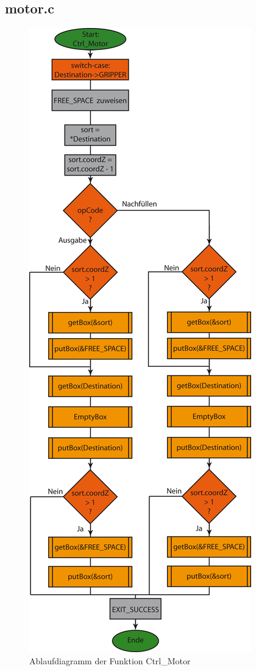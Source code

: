 \subsection{motor.c}


\begin{figure}[h]
\includegraphics[scale = 0.8]{./Ctrl_Motor.png}
\hspace{-14pt}
\caption{Ablaufdiagramm der Funktion Ctrl\_Motor}
\end{figure} 

